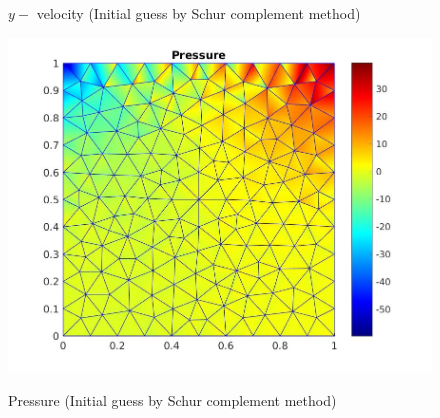 \documentclass[a4paper]{book}
\begin{document}
\begin{figure}
\begin{minipage}[c]{0.3\textwidth}
    \caption{$y-$ velocity (Initial guess by Schur complement method)}
  \label{y_vel_navier_stoke_schur_lid}
  \end{minipage}
  \begin{minipage}[c]{0.67\textwidth}
    \includegraphics[width=\textwidth]{lid_newton_pressure_schur.jpg}
  \end{minipage}\hfill
  \begin{minipage}[c]{0.3\textwidth}
    \caption{Pressure (Initial guess by Schur complement method)}
  \label{pressure_navier_stoke_schur_lid}
  \end{minipage}
\caption{\label{lid_driven_cavity_n_s_schur}}
\end{figure}
\end{document}
